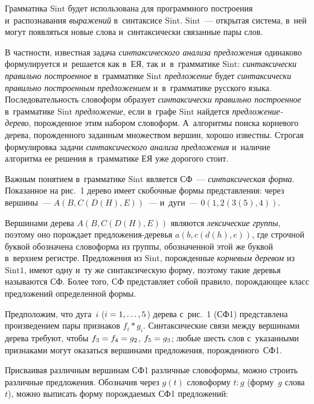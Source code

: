 \begin{multicols}{2}
    Грамматика $\mathrm{Sint}$ будет использована для программного построения 
и~распознавания \textit{выражений} в~синтаксисе $\mathrm{Sint}$. $\mathrm{Sint}$~--- открытая 
система, в~ней могут появляться новые слова и~синтаксически связанные 
пары слов.
    
    В частности, известная задача \textit{синтаксического анализа 
предложения} одинаково формулируется и~решается как в~ЕЯ, так 
и~в~грамматике $\mathrm{Sint}$: \textit{синтаксически правильно построенное} 
в~грамматике $\mathrm{Sint}$ \textit{предложение} будет \textit{синтаксически 
правильно построенным предложением} и~в~грамматике русского языка. 
Последовательность словоформ образует \textit{синтаксически правильно 
построенное} в~грамматике $\mathrm{Sint}$ \textit{предложение}, если в~графе 
$\mathrm{Sint}$ 
найдется \textit{пред\-ло\-же\-ние-де\-ре\-во}, по\-рож\-ден\-ное этим набором 
словоформ. А~алгоритмы поиска корневого дерева, по\-рож\-ден\-но\-го заданным 
множеством вершин, хорошо известны. Строгая формулировка задачи 
\textit{синтаксического анализа предложения} и~наличие алгоритма ее 
решения в~грамматике ЕЯ уже дорогого стоит.
    
     Важным понятием в~грамматике $\mathrm{Sint}$ является СФ~--- 
\textit{синтаксическая форма}. Показанное на рис.~1 дерево имеет 
скобочные формы представления: через вершины~--- $A(B, C(D(H), E))$~--- 
и~дуги~--- $0(1, 2(3(5), 4))$.
                    
 
     
     Вершинами дерева $A(B, C(D(H), E))$ являются \textit{лексические 
группы}, поэтому оно порождает пред\-ло\-же\-ния-де\-ревья $a(b, c(d(h), e))$, 
где строчной буквой обозначена словоформа из группы, обозначенной этой 
же буквой в~верхнем регистре. Предложения из $\mathrm{Sint}$, порожденные 
\textit{корневым деревом} из $\mathrm{Sint1}$, имеют одну и~ту же синтаксическую 
форму, поэтому такие деревья называются СФ. Более того, СФ представляет 
собой правило, порождающее класс предложений определенной формы.
     
     Предположим, что дуга~$i$ ($i \hm= 1, \ldots, 5$) дерева с~рис.~1 (СФ1) 
представлена произведением пары признаков $f_i*g_i$. Синтаксические связи 
между вершинами дерева требуют, чтобы $f_3\hm=f_4\hm =g_2$, $f_5\hm=g_3$; 
любые шесть слов с~указанными признаками могут оказаться вершинами 
предложения, порожденного~СФ1.
     
     Присваивая различным вершинам СФ1 различные словоформы, можно 
строить различные предложения. Обозначив через $g(t)$ словоформу $t:g$ 
(форму~$g$ слова~$t$), можно выписать форму по\-рож\-да\-емых СФ1 
предложений:


\end{multicols}
